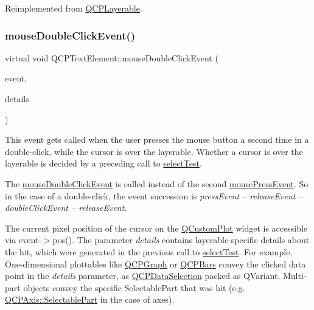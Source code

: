 Reimplemented from \hyperlink{class_q_c_p_layerable_a4171e2e823aca242dd0279f00ed2de81}{Q\+C\+P\+Layerable}.

\mbox{\label{class_q_c_p_text_element_a45dcc9c527018f879c28b0d61b57147f}} 
\subsubsection{\texorpdfstring{mouse\+Double\+Click\+Event()}{mouseDoubleClickEvent()}\hspace{0.1cm}{\footnotesize\ttfamily [2/2]}}
{\footnotesize\ttfamily virtual void Q\+C\+P\+Text\+Element\+::mouse\+Double\+Click\+Event (\begin{DoxyParamCaption}\item[{Q\+Mouse\+Event $\ast$}]{event,  }\item[{const Q\+Variant \&}]{details }\end{DoxyParamCaption})\hspace{0.3cm}{\ttfamily [virtual]}}

This event gets called when the user presses the mouse button a second time in a double-\/click, while the cursor is over the layerable. Whether a cursor is over the layerable is decided by a preceding call to \hyperlink{class_q_c_p_text_element_a1e721bc2994a127ef5a8f0a514a5dbac}{select\+Test}.

The \hyperlink{class_q_c_p_text_element_a2272ff775ab385f612e9fd39773de7c0}{mouse\+Double\+Click\+Event} is called instead of the second \hyperlink{class_q_c_p_text_element_ad7b2c98355e3d2f912574b74fcee0574}{mouse\+Press\+Event}. So in the case of a double-\/click, the event succession is {\itshape press\+Event -- release\+Event -- double\+Click\+Event -- release\+Event}.

The current pixel position of the cursor on the \hyperlink{class_q_custom_plot}{Q\+Custom\+Plot} widget is accessible via {\ttfamily event-\/$>$pos()}. The parameter {\itshape details} contains layerable-\/specific details about the hit, which were generated in the previous call to \hyperlink{class_q_c_p_text_element_a1e721bc2994a127ef5a8f0a514a5dbac}{select\+Test}. For example, One-\/dimensional plottables like \hyperlink{class_q_c_p_graph}{Q\+C\+P\+Graph} or \hyperlink{class_q_c_p_bars}{Q\+C\+P\+Bars} convey the clicked data point in the {\itshape details} parameter, as \hyperlink{class_q_c_p_data_selection}{Q\+C\+P\+Data\+Selection} packed as Q\+Variant. Multi-\/part objects convey the specific {\ttfamily Selectable\+Part} that was hit (e.\+g. \hyperlink{class_q_c_p_axis_abee4c7a54c468b1385dfce2c898b115f}{Q\+C\+P\+Axis\+::\+Selectable\+Part} in the case of axes).

